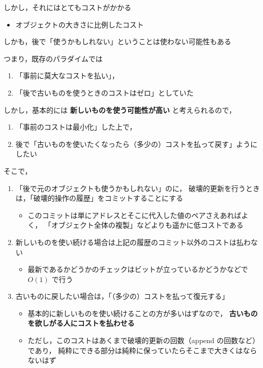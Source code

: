 \documentclass[10pt, a4j, twocolumn]{scrartcl}
\begin{document}
しかし，それにはとてもコストがかかる
\begin{itemize}
\item オブジェクトの大きさに比例したコスト
\end{itemize}


しかも，後で「使うかもしれない」ということは使わない可能性もある

つまり，既存のパラダイムでは
\begin{enumerate}
\item 「事前に莫大なコストを払い」，
\item 「後で古いものを使うときのコストはゼロ」としていた
\end{enumerate}

しかし，基本的には \textbf{\textbf{新しいものを使う可能性が高い}} と考えられるので，
\begin{enumerate}
\item 「事前のコストは最小化」した上で，
\item 後で「古いものを使いたくなったら（多少の）コストを払って戻す」ようにしたい
\end{enumerate}


そこで，
\begin{enumerate}
\item 「後で元のオブジェクトも使うかもしれない」のに，
破壊的更新を行うときは，「破壊的操作の履歴」をコミットすることにする
\begin{itemize}
\item このコミットは単にアドレスとそこに代入した値のペアさえあればよく，
「オブジェクト全体の複製」などよりも遥かに低コストである
\end{itemize}
\item 新しいものを使い続ける場合は上記の履歴のコミット以外のコストは払わない
\begin{itemize}
\item 最新であるかどうかのチェックはビットが立っているかどうかなどで \(O(1)\) で行う
\end{itemize}
\item 古いものに戻したい場合は，「（多少の）コストを払って復元する」
\begin{itemize}
\item 基本的に新しいものを使い続けることの方が多いはずなので，
\textbf{\textbf{古いものを欲しがる人にコストを払わせる}}
\item ただし，このコストはあくまで破壊的更新の回数（append の回数など）であり，
純粋にできる部分は純粋に保っていたらそこまで大きくはならないはず
\end{itemize}
\end{enumerate}
\end{document}
